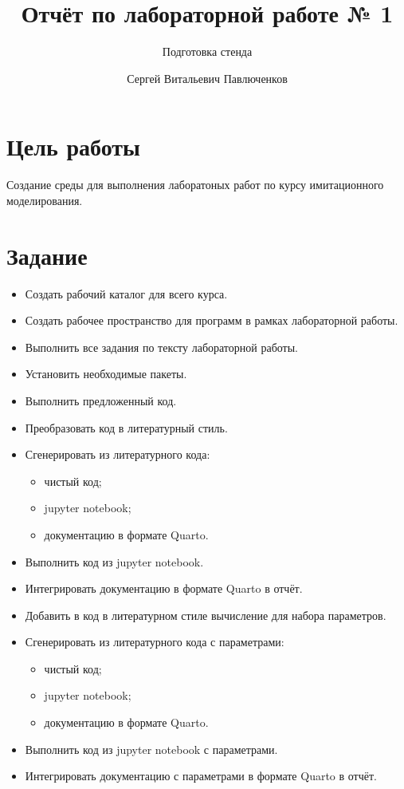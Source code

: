 \documentclass[
  english,
  russian,
  12pt,
  a4paper,
  DIV=11,
  numbers=noendperiod]{scrreprt}
\title{Отчёт по лабораторной работе № 1}
\subtitle{Подготовка стенда}
\author{Сергей Витальевич Павлюченков}
\date{}
\providecommand{\tightlist}{%
  \setlength{\itemsep}{0pt}\setlength{\parskip}{0pt}}
\renewcommand*\contentsname{Table of contents}
\newcommand\contentsname{Table of contents}
\begin{document}
\maketitle

\renewcommand*\contentsname{Table of contents}
{
\setcounter{tocdepth}{1}
\tableofcontents
}
\listoffigures
\listoftables

\chapter{Цель
работы}\label{ux446ux435ux43bux44c-ux440ux430ux431ux43eux442ux44b}

Создание среды для выполнения лаборатоных работ по курсу имитационного
моделирования.

\chapter{Задание}\label{ux437ux430ux434ux430ux43dux438ux435}

\begin{itemize}
\tightlist
\item
  Создать рабочий каталог для всего курса.
\item
  Создать рабочее пространство для программ в рамках лабораторной
  работы.
\item
  Выполнить все задания по тексту лабораторной работы.
\item
  Установить необходимые пакеты.
\item
  Выполнить предложенный код.
\item
  Преобразовать код в литературный стиль.
\item
  Сгенерировать из литературного кода:

  \begin{itemize}
  \tightlist
  \item
    чистый код;
  \item
    jupyter notebook;
  \item
    документацию в формате Quarto.
  \end{itemize}
\item
  Выполнить код из jupyter notebook.
\item
  Интегрировать документацию в формате Quarto в отчёт.
\item
  Добавить в код в литературном стиле вычисление для набора параметров.
\item
  Сгенерировать из литературного кода с параметрами:

  \begin{itemize}
  \tightlist
  \item
    чистый код;
  \item
    jupyter notebook;
  \item
    документацию в формате Quarto.
  \end{itemize}
\item
  Выполнить код из jupyter notebook с параметрами.
\item
  Интегрировать документацию с параметрами в формате Quarto в отчёт.
\end{itemize}
\end{document}
